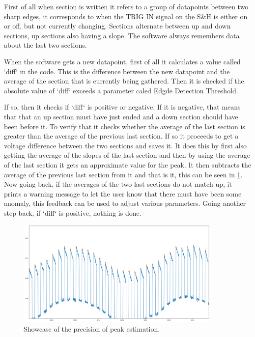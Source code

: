\documentclass[a4paper, 10pt]{article}
\begin{document}
First of all when section is written it refers to a group of datapoints between two sharp edges, it corresponds to when the TRIG IN signal on the S\&H is either on or off, but not currently changing.
Sections alternate between up and down sections, up sections also having a slope.
The software always remembers data about the last two sections.

When the software gets a new datapoint, first of all it calculates a value called `diff` in the code.
This is the difference between the new datapoint and the average of the section that is currently being gathered.
Then it is checked if the absolute value of `diff` exceeds a parameter caled Edgde Detection Threshold.

If so, then it checks if `diff` is positive or negative.
If it is negative, that means that that an up section must have just ended and a down section should have been before it.
To verify that it checks whether the average of the last section is greater than the average of the previous last section.
If so it proceeds to get a voltage difference between the two sections and saves it.
It does this by first also getting the average of the slopes of the last section and then by using the average of the last section it gets an approximate value for the peak.
It then subtracts the average of the previous last section from it and that is it, this can be seen in \cref{fig:soft-spike-est}.
Now going back, if the averages of the two last sections do not match up, it prints a warning message to let the user know that there must have been some anomaly, this feedback can be used to adjust various parameters.
Going another step back, if `diff` is positive, nothing is done.

\begin{figure}[H]
    \centering
    \includegraphics[width=0.9\textwidth]{../images/soft-spike-est.png}
    \caption{Showcase of the precision of peak estimation.}
    \label{fig:soft-spike-est}
\end{figure}
\end{document}
